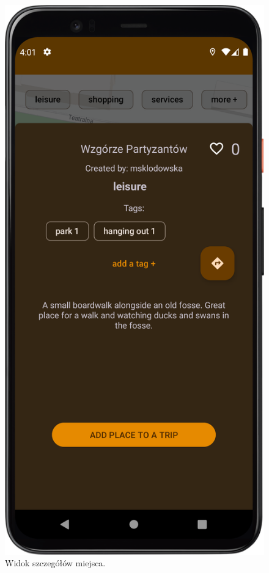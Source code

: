         \begin{figure}[H]
            \centering
            \includegraphics[scale=0.10]{src/app/place_viewer.png}
            \caption{Widok szczegółów miejsca.\label{place}}
            \qquad
        \end{figure} 

